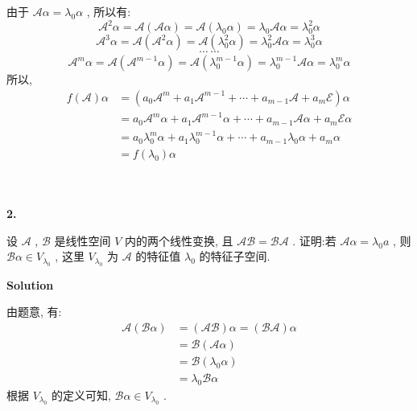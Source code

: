 \documentclass[11pt,a4paper,openany,oneside]{book}
\newcommand\Solution{\noindent\textbf{\textsf{Solution}}\par\medskip}
\begin{document}
由于 $ \mathcal{A}\alpha = \lambda_0 \alpha $ , 所以有:
 $$  \mathcal{A}^2\alpha = \mathcal{A}(\mathcal{A}\alpha) = \mathcal{A}(\lambda_0\alpha) = \lambda_0\mathcal{A}\alpha = \lambda_0^2\alpha   $$ 
 $$  \mathcal{A}^3\alpha = \mathcal{A}(\mathcal{A}^2\alpha) = \mathcal{A}(\lambda_0^2\alpha) = \lambda_0^2\mathcal{A}\alpha = \lambda_0^3\alpha   $$ 
 $$  \cdots \ \cdots  $$ 
 $$  \mathcal{A}^m\alpha = \mathcal{A}(\mathcal{A}^{m-1}\alpha) = \mathcal{A}(\lambda_0^{m-1}\alpha) = \lambda_0^{m-1}\mathcal{A}\alpha = \lambda_0^m\alpha   $$ 
所以,
\begin{align*}
f(\mathcal{A})\alpha &= \left(a_0\mathcal{A}^m + a_1\mathcal{A}^{m-1} + \cdots + a_{m-1}\mathcal{A} + a_m\mathcal{E} \right)\alpha  \\
&=a_0\mathcal{A}^m\alpha + a_1\mathcal{A}^{m-1}\alpha + \cdots + a_{m-1}\mathcal{A}\alpha + a_m\mathcal{E}\alpha  \\
&=a_0\lambda_0^m\alpha + a_1\lambda_0^{m-1}\alpha + \cdots + a_{m-1}\lambda_0\alpha + a_m\alpha  \\
&=f(\lambda_0)\alpha
\end{align*}  \\  \\ 

\begin{myexample}
	\textbf{2.}

设 $ \mathcal{A} $ , $ \mathcal{B} $ 是线性空间 $ V $ 内的两个线性变换, 且 $ \mathcal{AB} = \mathcal{BA} $ . 证明:若 $ \mathcal{A}\alpha = \lambda_0a $ , 则 $ \mathcal{B}\alpha \in V_{\lambda_0} $ , 这里 $ V_{\lambda_0} $ 为 $ \mathcal{A} $ 的特征值 $ \lambda_0 $ 的特征子空间.  \\

\end{myexample}
\Solution 

由题意, 有:
\begin{align*}
\mathcal{A}(\mathcal{B}\alpha) &= (\mathcal{AB})\alpha = (\mathcal{BA})\alpha  \\
&= \mathcal{B}(\mathcal{A}\alpha)  \\
&= \mathcal{B}(\lambda_0\alpha)  \\
&= \lambda_0\mathcal{B}\alpha
\end{align*}
根据 $ V_{\lambda_0} $ 的定义可知,  $ \mathcal{B}\alpha \in V_{\lambda_0} $ . \\  \\  \\
\end{document}
